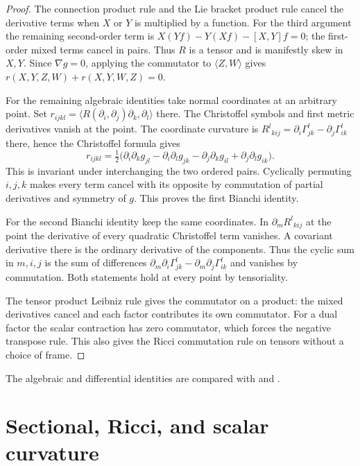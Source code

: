 \documentclass[11pt,oneside,openany]{book}
\theoremstyle{plain}
\theoremstyle{definition}
\theoremstyle{remark}
\begin{document}
\begin{proof}
The connection product rule and the Lie bracket product rule
cancel the derivative terms when \(X\) or \(Y\) is multiplied
by a function. For the third argument the remaining second-order
term is \(X(Yf)-Y(Xf)-[X,Y]f=0\); the first-order mixed terms
cancel in pairs. Thus \(R\) is a tensor and is manifestly
skew in \(X,Y\). Since \(\nabla g=0\), applying the commutator
to \(\langle Z,W\rangle\) gives
\(r(X,Y,Z,W)+r(X,Y,W,Z)=0\).

For the remaining algebraic identities take normal coordinates
at an arbitrary point. Set
\(r_{ijkl}=\langle R(\partial_i,\partial_j)\partial_k,\partial_l\rangle\)
there. The Christoffel symbols and first metric derivatives vanish
at the point. The coordinate curvature is
\(R^l{}_{kij}=\partial_i\Gamma^l_{jk}-\partial_j\Gamma^l_{ik}\)
there, hence the Christoffel formula gives
\[
 r_{ijkl}=\tfrac12
   \bigl(\partial_i\partial_k g_{jl}-\partial_i\partial_l g_{jk}
          -\partial_j\partial_k g_{il}+\partial_j\partial_l g_{ik}\bigr).
\]
This is invariant under interchanging the two ordered pairs.
Cyclically permuting \(i,j,k\) makes every term cancel with its
opposite by commutation of partial derivatives and symmetry of \(g\).
This proves the first Bianchi identity.

For the second Bianchi identity keep the same coordinates.
In \(\partial_m R^l{}_{kij}\) at the point the derivative of every
quadratic Christoffel term vanishes. A covariant derivative there
is the ordinary derivative of the components. Thus the cyclic sum
in \(m,i,j\) is the sum of differences
\(\partial_m\partial_i\Gamma^l_{jk}-\partial_m\partial_j\Gamma^l_{ik}\)
and vanishes by commutation. Both statements hold at every point
by tensoriality.

The tensor product Leibniz rule gives the commutator on a product:
the mixed derivatives cancel and each factor contributes its own
commutator. For a dual factor the scalar contraction has zero
commutator, which forces the negative transpose rule. This
also gives the Ricci commutation rule on tensors without a choice
of frame.
\end{proof}

The algebraic and differential identities are compared with
\cite[Chapter 7]{LeeRM} and \cite[Chapter 4]{dC}.

\section{Sectional, Ricci, and scalar curvature}\label{p202:G13}
\end{document}
